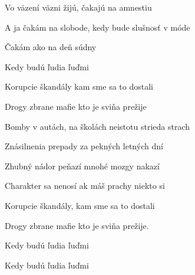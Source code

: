 \begin{song}


 \quad

\large


\Large

\bigskip

\begin{chorusbox}{\Refren}
Vo väzení väzni žijú, čakajú na amnestiu \par
{}A ja čakám na slobode, kedy bude slušnosť v móde \par
{}Čakám ako na deň súdny \par
{}Kedy budú ľudia ľuďmi \par
\end{chorusbox}

\bigskip

 Korupcie škandály  kam sme sa to dostali \par
{} Drogy zbrane mafie kto je sviňa prežije \par
{} Bomby v autách, na školách  neistotu strieda strach \par
{} Znásilnenia prepady za pekných letných dní \par
{} \par

\bigskip

\Refren

\bigskip

 Zhubný nádor peňazí  mnohé mozgy nakazí \par
{} Charakter sa nenosí ak máš prachy niekto si \par
{} Korupcie škandály,  kam sme sa to dostali \par
{} Drogy zbrane mafie kto je sviňa prežije. \par
{} \par

\bigskip

\Refren

\bigskip

Kedy budú ľudia ľuďmi \par
{}Kedy budú ľudia ľuďmi \par

\end{song}